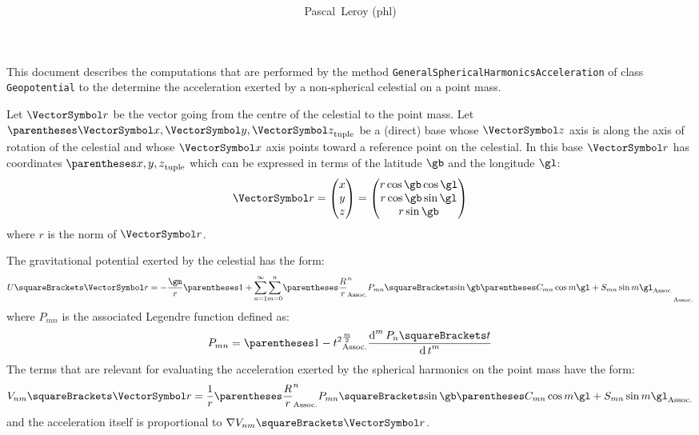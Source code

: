 \documentclass[10pt, a4paper, oneside]{basestyle}
\title{%
\textdisplay{%
Geopotential%
}%
}
\author{Pascal~Leroy (phl)}
\begin{document}
\maketitle
\begin{sloppypar}
\noindent
This document describes the computations that are performed by the method \texttt{GeneralSphericalHarmonicsAcceleration} of class \texttt{Geopotential} to the determine the acceleration exerted by a non-spherical celestial on a point mass.
\end{sloppypar}

Let $\vr$ be the vector going from the centre of the celestial to the point mass.  Let $\tuple{\vx, \vy, \vz}$ be a (direct) base whose $\vz$ axis is along the axis of rotation of the celestial and whose $\vx$ axis points toward a reference point on the celestial.  In this base $\vr$ has coordinates $\tuple{x, y, z}$ which can be expressed in terms of the latitude $\gb$ and the longitude $\gl$:
\[
\vr=\begin{pmatrix}
x \\ y \\ z
\end{pmatrix}
=\begin{pmatrix}
r \cos \gb \cos \gl\\
r \cos \gb \sin \gl\\
r \sin \gb
\end{pmatrix}
\]
where $r$ is the norm of $\vr$.

The gravitational potential exerted by the celestial has the form:
\[
U\of\vr = -\frac{\gm}{r}\pa{1 + \sum{n = 1}[\infty] \sum{m = 0}[n] 
\pa{\frac{R}{r}}^n P_{m n}\of{\sin \gb}
\pa{C_{m n} \cos m \gl + S_{m n} \sin m \gl}
}
\]
where $P_{m n}$ is the associated Legendre function defined as:
\[
P_{m n} = \pa{1 - t^2}^{\frac{m}{2}} \deriv[m] t {P_n\of t}
\]
The terms that are relevant for evaluating the acceleration exerted by the spherical harmonics on the point mass have the form:
\[
V_{n m}\of\vr = \frac{1}{r}\pa{\frac{R}{r}}^n P_{m n}\of{\sin \gb}
\pa{C_{m n} \cos m \gl + S_{m n} \sin m \gl}
\]
and the acceleration itself is proportional to $\grad V_{n m}\of\vr$.
\end{document}
